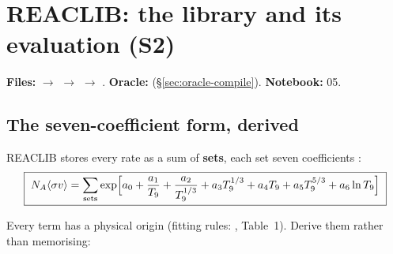 %

\section{REACLIB: the library and its evaluation (S2)}
\label{part:reaclib}

\begin{repopointer}
\textbf{Files:}  $\to$
 $\to$  $\to$
. \quad
\textbf{Oracle:} 
(\S\ref{sec:oracle-compile}). \quad
\textbf{Notebook:} 05.
\end{repopointer}

\subsection{The seven-coefficient form, derived}
\label{sec:sevencoeff}

REACLIB stores every rate as a sum of \textbf{sets}, each set seven
coefficients \citep[eq.~1]{cyburt2010}:
%
\begin{equation}
\boxed{\;
N_{A}\langle\sigma v\rangle
= \sum_{\text{sets}} \exp\Bigl[
a_0 + \frac{a_1}{T_{9}} + \frac{a_2}{T_{9}^{1/3}} + a_3 T_{9}^{1/3}
+ a_4 T_{9} + a_5 T_{9}^{5/3} + a_6 \ln T_{9} \Bigr]
\;}
\label{eq:reaclib}
\end{equation}

Every term has a physical origin (fitting rules: \citealp{cyburt2010},
Table~1). Derive them rather than memorising:

